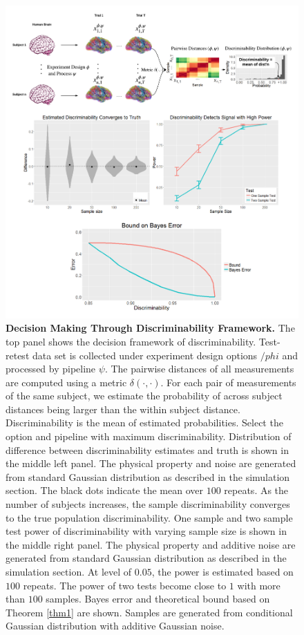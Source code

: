 \documentclass{article}
\begin{document}
\begin{figure}[H]
	\includegraphics[width=\linewidth]{../Figs/flow_simu.png}
	\caption{{\bf Decision Making Through Discriminability Framework.} The top panel shows the decision framework of discriminability. Test-retest data set is collected under experiment design options $/phi$ and processed by pipeline $\psi$. The pairwise distances of all measurements are computed using a metric $\delta(\cdot,\cdot)$. For each pair of measurements of the same subject, we estimate the probability of across subject distances being larger than the within subject distance. Discriminability is the mean of estimated probabilities. Select the option and pipeline with maximum discriminability. 
	 Distribution of difference between discriminability estimates and truth is shown in the middle left panel. The physical property and noise are generated from standard Gaussian distribution as described in the simulation section. The black dots indicate the mean over $100$ repeats. As the number of subjects increases, the sample discriminability converges to the true population discriminability.
	 One sample and two sample test power of discriminability with varying sample size is shown in the middle right panel. The physical property and additive noise are generated from standard Gaussian distribution as described in the simulation section. At level of $0.05$, the power is estimated based on $100$ repeats. The power of two tests become close to $1$ with more than $100$ samples.
	 Bayes error and theoretical bound based on Theorem \ref{thm1} are shown. Samples are generated from conditional Gaussian distribution with additive Gaussian noise.}
	\label{fig:fc}
\end{figure}
\end{document}
